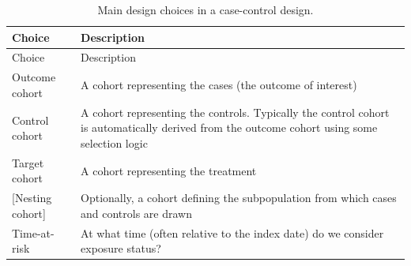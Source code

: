 \documentclass[11pt]{book}
\begin{document}
\begin{longtable}[]{@{}ll@{}}
\caption{\label{tab:ccChoices} Main design choices in a case-control
design.}\tabularnewline
\toprule
\begin{minipage}[b]{0.23\columnwidth}\raggedright\strut
Choice\strut
\end{minipage} & \begin{minipage}[b]{0.71\columnwidth}\raggedright\strut
Description\strut
\end{minipage}\tabularnewline
\midrule
\endfirsthead
\toprule
\begin{minipage}[b]{0.23\columnwidth}\raggedright\strut
Choice\strut
\end{minipage} & \begin{minipage}[b]{0.71\columnwidth}\raggedright\strut
Description\strut
\end{minipage}\tabularnewline
\midrule
\endhead
\begin{minipage}[t]{0.23\columnwidth}\raggedright\strut
Outcome cohort\strut
\end{minipage} & \begin{minipage}[t]{0.71\columnwidth}\raggedright\strut
A cohort representing the cases (the outcome of interest)\strut
\end{minipage}\tabularnewline
\begin{minipage}[t]{0.23\columnwidth}\raggedright\strut
Control cohort\strut
\end{minipage} & \begin{minipage}[t]{0.71\columnwidth}\raggedright\strut
A cohort representing the controls. Typically the control cohort is
automatically derived from the outcome cohort using some selection
logic\strut
\end{minipage}\tabularnewline
\begin{minipage}[t]{0.23\columnwidth}\raggedright\strut
Target cohort\strut
\end{minipage} & \begin{minipage}[t]{0.71\columnwidth}\raggedright\strut
A cohort representing the treatment\strut
\end{minipage}\tabularnewline
\begin{minipage}[t]{0.23\columnwidth}\raggedright\strut
{[}Nesting cohort{]}\strut
\end{minipage} & \begin{minipage}[t]{0.71\columnwidth}\raggedright\strut
Optionally, a cohort defining the subpopulation from which cases and
controls are drawn\strut
\end{minipage}\tabularnewline
\begin{minipage}[t]{0.23\columnwidth}\raggedright\strut
Time-at-risk\strut
\end{minipage} & \begin{minipage}[t]{0.71\columnwidth}\raggedright\strut
At what time (often relative to the index date) do we consider exposure
status?\strut
\end{minipage}\tabularnewline
\bottomrule
\end{longtable}
\end{document}
